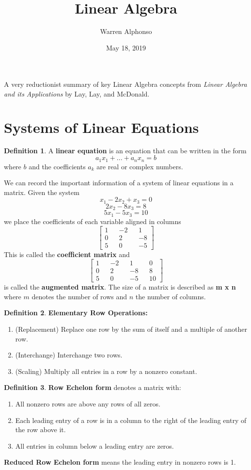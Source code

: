 \documentclass[letterpaper]{article}
\title{Linear Algebra}
\author{Warren Alphonso}
\date{May 18, 2019}
\theoremstyle{definition}
\newtheorem{definition}{Definition}[section]
\begin{document}
\maketitle
A very reductionist summary of key Linear Algebra concepts from \textit{Linear Algebra and its Applications} by Lay, Lay, and McDonald. 

\section{Systems of Linear Equations}
\begin{definition}
A \textbf{linear equation} is an equation that can be written in the form 
$$ a_{1}x_{1} + ... + a_{n}x_{n} = b$$ 
where $b$ and the coefficients $a_{k}$ are real or complex numbers. 
\end{definition}

We can record the important information of a system of linear equations in a matrix. Given the system
$$x_1 - 2x_2 + x_3 = 0$$ 
$$2x_2 - 8x_3 = 8 $$
$$5x_1 - 5x_3 = 10 $$
we place the coefficients of each variable aligned in columns
$$\begin{bmatrix}
1 && -2 && 1 \\
0 && 2 && -8 \\
5 && 0 && -5
\end{bmatrix}$$
This is called the \textbf{coefficient matrix} and 
$$\begin{bmatrix}
1 && -2 && 1 && 0 \\
0 && 2 && -8 && 8 \\
5 && 0 && -5 && 10
\end{bmatrix}$$
is called the \textbf{augmented matrix}. The size of a matrix is described as \textbf{ m x n} where $m$ denotes the number of rows and $n$ the number of columns. 

\begin{definition}
\textbf{Elementary Row Operations:}
\begin{enumerate}
	\item (Replacement) Replace one row by the sum of itself and a multiple of another row. 
	\item (Interchange) Interchange two rows. 
	\item (Scaling) Multiply all entries in a row by a nonzero constant. 
\end{enumerate}
\end{definition}

\begin{definition}
\textbf{Row Echelon form} denotes a matrix with: 
\begin{enumerate}
	\item All nonzero rows are above any rows of all zeros.
	\item Each leading entry of a row is in a column to the right of the leading entry of the row above it. 
	\item All entries in  column below a leading entry are zeros. 
\end{enumerate}
\textbf{Reduced Row Echelon form} means the leading entry in nonzero rows is 1. 
\end{definition}
\end{document}
